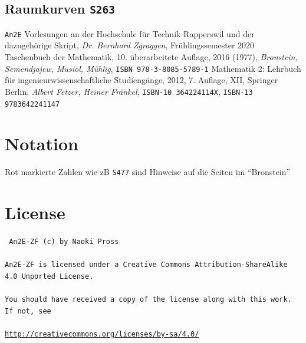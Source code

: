\documentclass[a4paper, twocolumn]{article}
\numberwithin{equation}{subsection}
\newcommand{\brpage}[1]{\textcolor{red!70!black}{\small\texttt{S#1}}}
\begin{document}
\subsection{Raumkurven \brpage{263}}

\begin{thebibliography}{3}
    \texttt{An2E} Vorlesungen an der Hochschule f\"ur Technik Rapperswil und der dazugeh\"orige Skript,
    \textit{Dr. Bernhard Zgraggen}, Fr\"uhlingssemester 2020
    Taschenbuch der Mathematik,
    10. \"uberarbeitete Auflage, 2016 (1977),
    \textit{Bronstein, Semendjajew, Musiol, M\"uhlig}, 
    \texttt{ISBN 978-3-8085-5789-1}
    Mathematik 2: Lehrbuch für ingenieurwissenschaftliche Studieng\"ange,
    2012, 7. Auflage, XII, Springer Berlin,
    \textit{Albert Fetzer, Heiner Fränkel},
    \texttt{ISBN-10 364224114X},
    \texttt{ISBN-13 9783642241147}
    
\end{thebibliography}

\section*{Notation}
Rot markierte Zahlen wie zB \brpage{477} sind Hinweise auf die Seiten im ``Bronstein'' \cite{bronstein}

\section*{License}
{ \tt
An2E-ZF (c) by Naoki Pross
\\\\
An2E-ZF is licensed under a Creative Commons Attribution-ShareAlike 4.0 Unported License.
\\\\
You should have received a copy of the license along with this work. If not, see 
\\\\
{\small\url{http://creativecommons.org/licenses/by-sa/4.0/}}
}


\onecolumn
\end{document}
